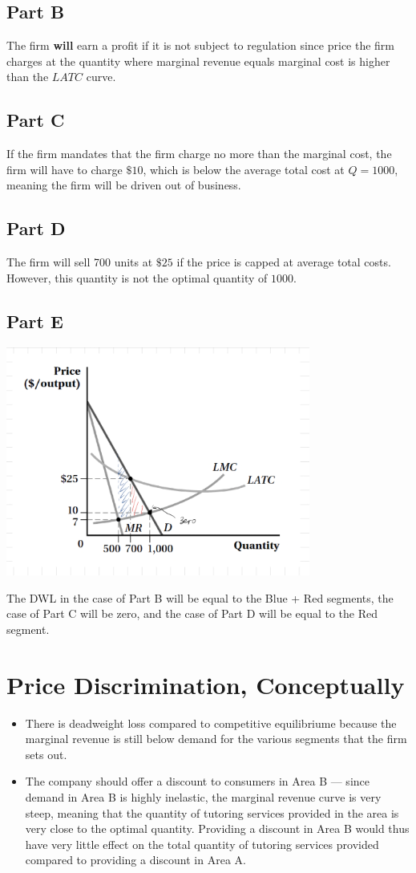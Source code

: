 \documentclass[8pt]{extarticle}
\begin{document}
{\subsection*{Part B}
The firm \textbf{will} earn a profit if it is not subject to regulation since price the firm charges at the quantity where marginal revenue equals marginal cost is higher than the $LATC$ curve.
\subsection*{Part C}
If the firm mandates that the firm charge no more than the marginal cost, the firm will have to charge $\$10$, which is below the average total cost at $Q = 1000$, meaning the firm will be driven out of business.
\subsection*{Part D}
The firm will sell 700 units at $\$25$ if the price is capped at average total costs. However, this quantity is not the optimal quantity of $1000$.
\subsection*{Part E}
\begin{center}
	\includegraphics[width=10cm]{HW10Q5E}
\end{center}
The DWL in the case of Part B will be equal to the Blue + Red segments, the case of Part C will be zero, and the case of Part D will be equal to the Red segment.
\section*{Price Discrimination, Conceptually}
\begin{itemize}
	\item There is deadweight loss compared to competitive equilibriume because the marginal revenue is still below demand for the various segments that the firm sets out.
	\item The company should offer a discount to consumers in Area B --- since demand in Area B is highly inelastic, the marginal revenue curve is very steep, meaning that the quantity of tutoring services provided in the area is very close to the optimal quantity. Providing a discount in Area B would thus have very little effect on the total quantity of tutoring services provided compared to providing a discount in Area A.
\end{itemize}
}
\end{document}
